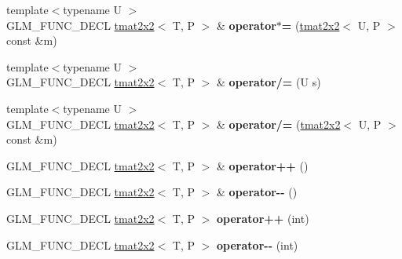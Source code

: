 \begin{DoxyCompactItemize}
\item 
\hypertarget{structglm_1_1tmat2x2_a22ec14725c380635ddec8d3c9c856bcc}{{\footnotesize template$<$typename U $>$ }\\G\-L\-M\-\_\-\-F\-U\-N\-C\-\_\-\-D\-E\-C\-L \hyperlink{structglm_1_1tmat2x2}{tmat2x2}$<$ T, P $>$ \& {\bfseries operator$\ast$=} (\hyperlink{structglm_1_1tmat2x2}{tmat2x2}$<$ U, P $>$ const \&m)}\label{structglm_1_1tmat2x2_a22ec14725c380635ddec8d3c9c856bcc}

\item 
\hypertarget{structglm_1_1tmat2x2_a9004d0d6f8a7e19c0d592a0f1f9aed65}{{\footnotesize template$<$typename U $>$ }\\G\-L\-M\-\_\-\-F\-U\-N\-C\-\_\-\-D\-E\-C\-L \hyperlink{structglm_1_1tmat2x2}{tmat2x2}$<$ T, P $>$ \& {\bfseries operator/=} (U s)}\label{structglm_1_1tmat2x2_a9004d0d6f8a7e19c0d592a0f1f9aed65}

\item 
\hypertarget{structglm_1_1tmat2x2_a2aa165291397c48680be24491256870e}{{\footnotesize template$<$typename U $>$ }\\G\-L\-M\-\_\-\-F\-U\-N\-C\-\_\-\-D\-E\-C\-L \hyperlink{structglm_1_1tmat2x2}{tmat2x2}$<$ T, P $>$ \& {\bfseries operator/=} (\hyperlink{structglm_1_1tmat2x2}{tmat2x2}$<$ U, P $>$ const \&m)}\label{structglm_1_1tmat2x2_a2aa165291397c48680be24491256870e}

\item 
\hypertarget{structglm_1_1tmat2x2_a9b29f7cc4e8fb411fcb0a7f1c26f5cd2}{G\-L\-M\-\_\-\-F\-U\-N\-C\-\_\-\-D\-E\-C\-L \hyperlink{structglm_1_1tmat2x2}{tmat2x2}$<$ T, P $>$ \& {\bfseries operator++} ()}\label{structglm_1_1tmat2x2_a9b29f7cc4e8fb411fcb0a7f1c26f5cd2}

\item 
\hypertarget{structglm_1_1tmat2x2_a3f180d690b3ebc06b9fc6ecc4cbd8349}{G\-L\-M\-\_\-\-F\-U\-N\-C\-\_\-\-D\-E\-C\-L \hyperlink{structglm_1_1tmat2x2}{tmat2x2}$<$ T, P $>$ \& {\bfseries operator-\/-\/} ()}\label{structglm_1_1tmat2x2_a3f180d690b3ebc06b9fc6ecc4cbd8349}

\item 
\hypertarget{structglm_1_1tmat2x2_a6fee5ef9bad6a0fd8edf45063557c188}{G\-L\-M\-\_\-\-F\-U\-N\-C\-\_\-\-D\-E\-C\-L \hyperlink{structglm_1_1tmat2x2}{tmat2x2}$<$ T, P $>$ {\bfseries operator++} (int)}\label{structglm_1_1tmat2x2_a6fee5ef9bad6a0fd8edf45063557c188}

\item 
\hypertarget{structglm_1_1tmat2x2_aeddcbe861c53a7dc006001e816da82d6}{G\-L\-M\-\_\-\-F\-U\-N\-C\-\_\-\-D\-E\-C\-L \hyperlink{structglm_1_1tmat2x2}{tmat2x2}$<$ T, P $>$ {\bfseries operator-\/-\/} (int)}\label{structglm_1_1tmat2x2_aeddcbe861c53a7dc006001e816da82d6}


\end{DoxyCompactItemize}
